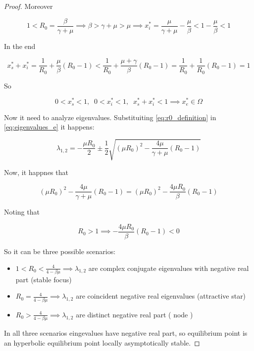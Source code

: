 \begin{proof}
Moreover

\begin{equation}
    1 < R_0 = \frac{\beta}{\gamma + \mu} \implies \beta > \gamma + \mu > \mu \implies x_i^* = \frac{\mu}{\gamma + \mu} - \frac{\mu}{\beta} < 1 - \frac{\mu}{\beta} < 1
\end{equation}

In the end

\begin{equation}
    x_s^* + x_i^* = \frac{1}{R_0} + \frac{\mu}{\beta}\left(R_0 - 1\right) < \frac{1}{R_0} + \frac{\mu+\gamma}{\beta}\left(R_0 - 1\right) =  \frac{1}{R_0} + \frac{1}{R_0}\left(R_0 - 1\right) = 1
\end{equation}

So

\begin{equation}
    0 < x_s^* < 1, \;\; 0 < x_i^* < 1, \;\; x_s^* + x_i^* < 1 \implies x_e^* \in \Omega 
\end{equation}

Now it need to analyze eigenvalues. Substituiting \ref{eq:r0_definition} in \ref{eq:eigenvalues_e} it happens:

\begin{equation}
    \lambda_{1,2} = -\frac{\mu R_0}{2} \pm \frac{1}{2}\sqrt{\left(\mu R_0\right)^2-\frac{4\mu}{\gamma + \mu}(R_0 - 1)}
\end{equation}

Now, it happnes that

\begin{equation}
    \left(\mu R_0\right)^2-\frac{4\mu}{\gamma + \mu}(R_0 - 1) = \left(\mu R_0\right)^2-\frac{4\mu R_0}{\beta}(R_0 - 1)
\end{equation}

Noting that

\begin{equation}
    R_0 > 1 \implies -\frac{4\mu R_0}{\beta}(R_0 - 1) < 0
\end{equation}

So it can be three possible scenarios:

\begin{itemize}
    \item $1 < R_0 < \frac{4}{4-\beta \mu} \implies \lambda_{1,2}$ are complex conjugate eigenvalues with negative real part (stable focus)
    
    \item $R_0 = \frac{4}{4-\beta \mu} \implies \lambda_{1,2}$ are coincident negative real eigenvalues (attractive star)
    
    \item $R_0 > \frac{4}{4-\beta \mu} \implies \lambda_{1,2}$ are distinct negative real part ( node )
\end{itemize}

In all three scenarios eingevalues have negative real part, so equilibrium point is an hyperbolic equilibrium point locally asymptotically stable.
\end{proof}